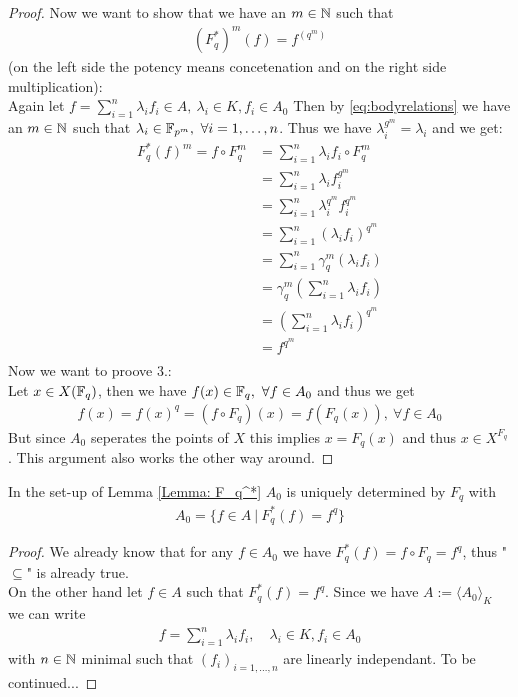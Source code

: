 \documentclass[]{article}
\begin{document}
\begin{proof}
    Now we want to show that we have an \(m \in {\mathbb{N}}\) such that 
    \begin{align*}
        (F_q^*)^m(f) = f^{(q^m)}
    \end{align*}
    (on the left side the potency means concetenation and on the right side multiplication): \\
    Again let \(f = \sum_{i=1}^{n} \lambda_i f_i \in A, \ \lambda_i \in K, f_i \in A_0\) Then by \eqref{eq:bodyrelations} we have an \(m \in {\mathbb{N}}\) such that 
    \(\lambda_i \in {\mathbb{F}}_{p^m}, \ \forall i=1, \dots, n\). Thus we have \(\lambda_i^{g^m}=\lambda_i\) and we get:
    \begin{align*}
        F_q^*(f)^m = f \circ F^m_q &= \sum_{i=1}^{n} \lambda_i f_i \circ F^m_q \\
        &= \sum_{i=1}^{n} \lambda_i f_i^{g^m} \\
        &= \sum_{i=1}^{n} \lambda_i^{q^m} f_i^{q^m} \\
        &= \sum_{i=1}^{n} (\lambda_i f_i)^{q^m} \\
        &= \sum_{i=1}^{n} \gamma^m_q(\lambda_i f_i) \\
        &= \gamma^m_q\left(\sum_{i=1}^{n} \lambda_i f_i\right) \\
        &= \left(\sum_{i=1}^{n} \lambda_i f_i\right)^{q^m} \\
        &= f^{q^m} \\
    \end{align*}
    Now we want to proove 3.: \\
    Let \(x \in X({\mathbb{F}}_q)\), then we have \(f(x) \in {\mathbb{F}}_q, \ \forall f \in A_0\) and thus we get
    \begin{align*}
        f(x)=f(x)^q=(f \circ F_q)(x)=f(F_q(x)), \ \forall f \in A_0
    \end{align*}
    But since \(A_0\) seperates the points of \(X\) this implies \(x = F_q(x)\) and thus \(x \in X^{F_q}\). This argument also works the other way around.
\end{proof}

\setcounter{theorem}{3}
\begin{remark}
    In the set-up of Lemma \ref{Lemma: F_q^*} \(A_0\) is uniquely determined by \(F_q\) with
    \begin{align*}
        A_0= \{f \in A \ | \ F^*_q(f)= f^q\}
    \end{align*}
\end{remark}
\begin{proof}
    We already know that for any \(f \in A_0\) we have \(F^*_q(f) = f \circ F_q = f^q\), thus "\(\subseteq\)" is already true. \\
    On the other hand let \(f \in A\) such that \(F^*_q(f)= f^q\). Since we have \(A:=\langle A_0 \rangle_K\) we can write
    \begin{align*}
        f = \sum_{i=1}^{n} \lambda_i f_i, \quad \lambda_i \in K, f_i \in A_0
    \end{align*}
    with \(n\in {\mathbb{N}}\) minimal such that \((f_i)_{i=1, \dots , n}\) are linearly independant. To be continued...
\end{proof}
\end{document}
